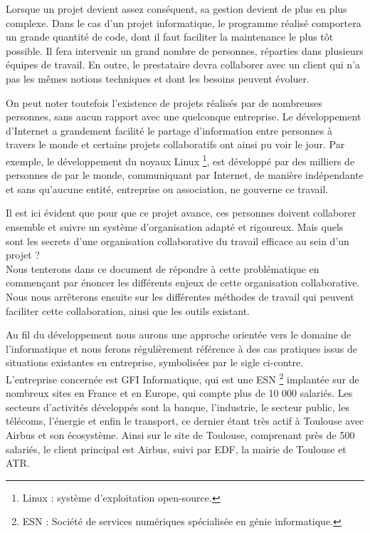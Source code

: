 
Lorsque un projet devient assez conséquent, sa gestion devient de plus en plus complexe. Dans le cas d'un projet informatique, le programme réalisé comportera un grande quantité de code, dont il faut faciliter la maintenance le plus tôt possible. Il fera intervenir un grand nombre de personnes, réparties dans plusieurs équipes de travail. En outre, le prestataire devra collaborer avec un client qui n'a pas les mêmes notions techniques et dont les besoins peuvent évoluer.

On peut noter toutefois l'existence de projets réalisés par de nombreuses personnes, sans aucun rapport avec une quelconque entreprise. Le développement d'Internet a grandement facilité le partage d'information entre personnes à travers le monde et certains projets collaboratifs ont ainsi pu voir le jour. Par exemple, le développement du noyaux Linux \footnote{Linux : système d'exploitation open-source.}, est développé par des milliers de personnes de par le monde, communiquant par Internet, de manière indépendante et sans qu'aucune entité, entreprise ou association, ne gouverne ce travail.

Il est ici évident que pour que ce projet avance, ces personnes doivent collaborer ensemble et suivre un système d'organisation adapté et rigoureux. Mais quels sont les secrets d'une organisation collaborative du travail efficace au sein d'un projet ?\\

Nous tenterons dans ce document de répondre à cette problématique en commençant par énoncer les différents enjeux de cette organisation collaborative. Nous nous arrêterons ensuite sur les différentes méthodes de travail qui peuvent faciliter cette collaboration, ainsi que les outils existant.

\begin{app}
Au fil du développement nous aurons une approche orientée vers le domaine de l'informatique et nous ferons régulièrement référence à des cas pratiques issus de situations existantes en entreprise, symbolisées par le sigle ci-contre.\\

L'entreprise concernée est GFI Informatique, qui est une \gls{ESN} \footnote{ESN : Société de services numériques spécialisée en génie informatique.} implantée sur de nombreux sites en France et en Europe, qui compte plus de 10 000 salariés. Les secteurs d'activités développés sont la banque, l'industrie, le secteur public, les télécoms, l'énergie et enfin le transport, ce dernier étant très actif à Toulouse avec Airbus et son écosystème. Ainsi sur le site de Toulouse, comprenant près de 500 salariés, le client principal est Airbus, suivi par EDF, la mairie de Toulouse et ATR.
\end{app}
